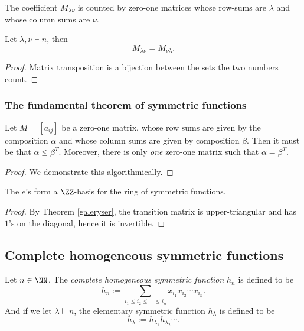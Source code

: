 \documentclass{article}
\begin{document}
\begin{theorem}
    The coefficient $M_{\lambda\nu}$ is counted by zero-one matrices whose row-sums are $\lambda$ and whose column sums are $\nu$.
\end{theorem}

\begin{theorem} \label{e2msymmetric}
    Let $\lambda,\nu \vdash n$, then
    \[
        M_{\lambda\nu} = M_{\nu\lambda}.
    \]
\end{theorem}

\begin{proof}
    Matrix transposition is a bijection between the sets the two numbers count.
\end{proof}

\subsubsection{The fundamental theorem of symmetric functions}
\begin{theorem} \label{galeryser} Let $M = [a_{ij}]$ be a zero-one matrix, whose row sums are given by the composition $\alpha$ and whose column sums are given by composition $\beta$. Then it must be that $\alpha \leq \beta^T$. Moreover, there is only \textit{one} zero-one matrix such that $\alpha = \beta^T$.
\end{theorem}

\begin{proof}
    We demonstrate this algorithmically.
\end{proof}
\begin{theorem} The $e$'s form a $\ZZ$-basis for the ring of symmetric functions.
\end{theorem}

\begin{proof}
    By Theorem \ref{galeryser}, the transition matrix is upper-triangular and has $1$'s on the diagonal, hence it is invertible. 
\end{proof}

\subsection{Complete homogeneous symmetric functions}

\begin{definition}
    Let $n\in\NN$. The \textit{complete homogeneous symmetric function} $h_n$ is defined to be
    \[
        h_n := \sum_{i_1\leq i_2\leq\ldots\leq i_n} x_{i_1}x_{i_2}\cdots x_{i_n}.
    \]
    And if we let $\lambda \vdash n$, the elementary symmetric function $h_\lambda$ is defined to be
    \[
        h_\lambda := h_{\lambda_1}h_{\lambda_2}\cdots.
    \]
\end{definition}
\end{document}
